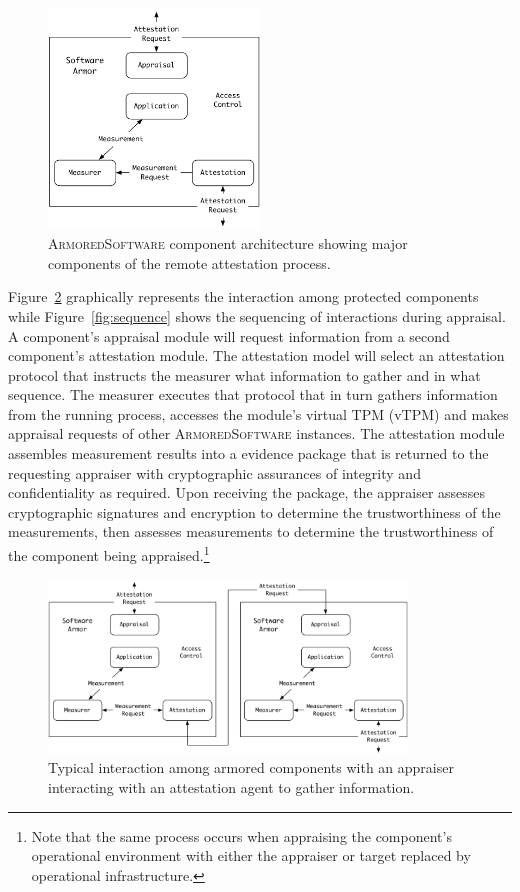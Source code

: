 \documentclass[10pt]{article}
\begin{document}
\begin{figure}
  \centering
  \includegraphics[width=0.5\textwidth]{figures/architecture.pdf}
  \caption{\textsc{ArmoredSoftware} component architecture showing
    major components of the remote attestation process.}
  \label{fig:architecture}
\end{figure}

Figure~\ref{fig:system} graphically represents the interaction among
protected components while Figure~\ref{fig:sequence} shows the
sequencing of interactions during appraisal.  A component's appraisal
module will request information from a second component's attestation
module.  The attestation model will select an attestation protocol
that instructs the measurer what information to gather and in what
sequence.  The measurer executes that protocol that in turn gathers
information from the running process, accesses the module's virtual
TPM (vTPM) and makes appraisal requests of other
\textsc{ArmoredSoftware} instances.  The attestation module assembles
measurement results into a evidence package that is returned to the
requesting appraiser with cryptographic assurances of integrity and
confidentiality as required.  Upon receiving the package, the
appraiser assesses cryptographic signatures and encryption to
determine the trustworthiness of the measurements, then assesses
measurements to determine the trustworthiness of the component being
appraised.\footnote{Note that the same process occurs when appraising
  the component's operational environment with either the appraiser or
  target replaced by operational infrastructure.}

\begin{figure}[hbtp]
  \centering
  \includegraphics[width=0.85\textwidth]{figures/system.pdf}
  \caption{Typical interaction among armored components with an
    appraiser interacting with an attestation agent to gather
    information.}
  \label{fig:system}
\end{figure}
\end{document}
